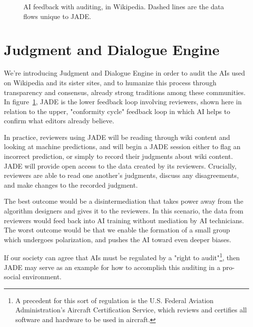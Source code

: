 \documentclass[format=sigconf]{acmart}
\begin{document}
\begin{figure}
\caption{AI feedback with auditing, in Wikipedia.  Dashed lines are the data flows unique to JADE.}\label{fig:audited}
\end{figure}

\section{Judgment and Dialogue Engine}

We're introducing Judgment and Dialogue Engine in order to audit the AIs used on Wikipedia and its sister sites, and to humanize this process through transparency and consensus, already strong traditions among these communities.  In figure~\ref{fig:audited}, JADE is the lower feedback loop involving reviewers, shown here in relation to the upper, "conformity cycle" feedback loop in which AI helps to confirm what editors already believe.

In practice, reviewers using JADE will be reading through wiki content and looking at machine predictions, and will begin a JADE session either to flag an incorrect prediction, or simply to record their judgments about wiki content.  JADE will provide open access to the data created by its reviewers.  Crucially, reviewers are able to read one another's judgments, discuss any disagreements, and make changes to the recorded judgment.

The best outcome would be a disintermediation that takes power away from the algorithm designers and gives it to the reviewers.  In this scenario, the data from reviewers would feed back into AI training without mediation by AI technicians.  The worst outcome would be that we enable the formation of a small group which undergoes polarization, and pushes the AI toward even deeper biases.

If our society can agree that AIs must be regulated by a "right to audit"\footnote{A precedent for this sort of regulation is the U.S. Federal Aviation Administration's Aircraft Certification Service, which reviews and certifies all software and hardware to be used in aircraft.}, then JADE may serve as an example for how to accomplish this auditing in a pro-social environment.


\end{document}
